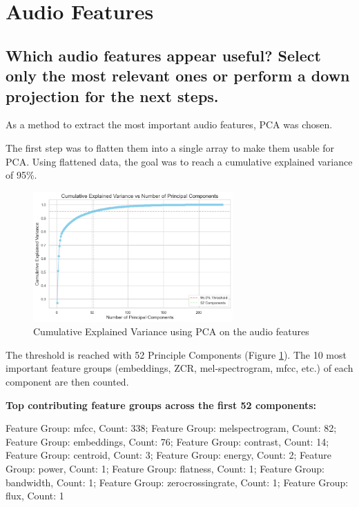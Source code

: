 
\section{Audio Features}
\label{sec:Audio Features}

\subsection{Which audio features appear useful? Select only the most relevant ones or perform a down projection for the next steps.}
\label{sec:Audio Features:a}

As a method to extract the most important audio features, PCA was chosen.

The first step was to flatten them into a single array to make them usable for PCA. Using flattened data, the goal was to reach a cumulative explained variance of 95\%. 


\begin{figure}[htbp]
    \centering
    \includegraphics[width=0.5\linewidth, height=5cm]{figs/Cumulative Explained Variance.png}
    \caption{Cumulative Explained Variance using PCA on the audio features}
    \label{fig:Cumulative Explained Variance}
\end{figure}

The threshold is reached with 52 Principle Components (Figure \ref{fig:Cumulative Explained Variance}).  The 10 most important feature groups (embeddings, ZCR, mel-spectrogram, mfcc, etc.) of each component are then counted. 

\textbf{Top contributing feature groups across the first 52 components:}

Feature Group: mfcc, Count: 338;
Feature Group: melspectrogram, Count: 82;
Feature Group: embeddings, Count: 76;
Feature Group: contrast, Count: 14;
Feature Group: centroid, Count: 3;
Feature Group: energy, Count: 2;
Feature Group: power, Count: 1;
Feature Group: flatness, Count: 1;
Feature Group: bandwidth, Count: 1;
Feature Group: zerocrossingrate, Count: 1;
Feature Group: flux, Count: 1

